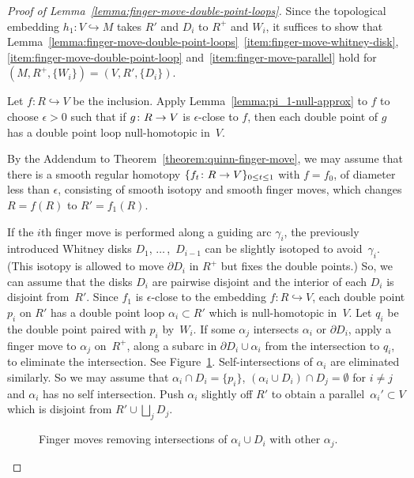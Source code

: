 \documentclass[11pt]{amsart}
\def\to{\mathchoice{\longrightarrow}{\rightarrow}{\rightarrow}{\rightarrow}}
\theoremstyle{definition}
\theoremstyle{theorem-giventitle}
\theoremstyle{definition-giventitle}
\numberwithin{equation}{section}
\begin{document}
\begin{proof}[Proof of Lemma~\ref{lemma:finger-move-double-point-loops}]
  Since the topological embedding $h_1\colon V\hookrightarrow M$ takes $R'$ and $D_i$ to $R^+$ and $W_i$, it suffices to show that Lemma~\ref{lemma:finger-move-double-point-loops}~\ref{item:finger-move-whitney-disk}, \ref{item:finger-move-double-point-loop} and~\ref{item:finger-move-parallel} hold for $(M,R^+,\{W_i\})= (V,R',\{D_i\})$.

  Let $f\colon R\hookrightarrow V$ be the inclusion.
  Apply Lemma~\ref{lemma:pi_1-null-approx} to $f$ to choose $\epsilon>0$ such that if $g\colon R\to V$ is $\epsilon$-close to $f$, then each double point of $g$ has a double point loop null-homotopic in~$V$.

  By the Addendum to Theorem~\ref{theorem:quinn-finger-move}, we may assume that there is a smooth regular homotopy $\{f_t\colon R \to V\}_{0\le t\le 1}$ with $f=f_0$, of diameter less than $\epsilon$, consisting of smooth isotopy and smooth finger moves, which changes $R=f(R)$ to $R'=f_1(R)$.

  If the $i$th finger move is performed along a guiding arc $\gamma_i$, the previously introduced Whitney disks $D_1$, $\ldots\,$,~$D_{i-1}$ can be slightly isotoped to avoid~$\gamma_i$. (This isotopy is allowed to move $\partial D_i$ in $R^+$ but fixes the double points.)
  So, we can assume that the disks $D_i$ are pairwise disjoint and the interior of each $D_i$ is disjoint from~$R'$.
  Since $f_1$ is $\epsilon$-close to the embedding $f\colon R\hookrightarrow V$, each double point $p_i$ on $R'$ has a double point loop $\alpha_i\subset R'$ which is null-homotopic in~$V$.
  Let $q_i$ be the double point paired with $p_i$ by~$W_i$.
  If some $\alpha_j$ intersects $\alpha_i$ or $\partial D_i$, apply a finger move to $\alpha_j$ on~$R^+$, along a subarc in $\partial D_i\cup \alpha_i$ from the intersection to $q_i$, to eliminate the intersection.
  See Figure~\ref{figure:clean-double-point-loop}.
  Self-intersections of $\alpha_i$ are eliminated similarly.
  So we may assume that $\alpha_i\cap D_i=\{p_i\}$, $(\alpha_i\cup D_i)\cap D_j=\emptyset$ for $i\ne j$ and $\alpha_i$ has no self intersection.
  Push $\alpha_i$ slightly off $R'$ to obtain a parallel~$\alpha_i'\subset V$ which is disjoint from $R'\cup\bigsqcup_j D_j$.

  \begin{figure}
    
    \caption{Finger moves removing intersections of $\alpha_i \cup D_i$ with other $\alpha_j$.}
    \label{figure:clean-double-point-loop}
  \end{figure}


\end{proof}
\end{document}
